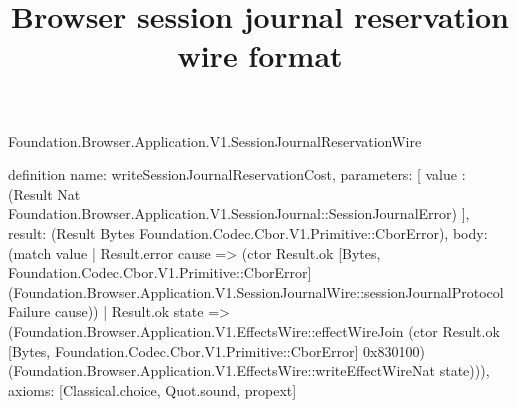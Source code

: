 \begin{lexlean}{Foundation.Browser.Application.V1.SessionJournalReservationWire}
\title{Browser session journal reservation wire format}
\begin{semanticmodule}
definition{
  name: writeSessionJournalReservationCost,
  parameters: [
    value : (Result Nat Foundation.Browser.Application.V1.SessionJournal::SessionJournalError)
  ],
  result: (Result Bytes Foundation.Codec.Cbor.V1.Primitive::CborError),
  body: (match value
    | Result.error cause => (ctor Result.ok [Bytes, Foundation.Codec.Cbor.V1.Primitive::CborError] (Foundation.Browser.Application.V1.SessionJournalWire::sessionJournalProtocolFailure cause))
    | Result.ok state => (Foundation.Browser.Application.V1.EffectsWire::effectWireJoin (ctor Result.ok [Bytes, Foundation.Codec.Cbor.V1.Primitive::CborError] 0x830100) (Foundation.Browser.Application.V1.EffectsWire::writeEffectWireNat state))),
  axioms: [Classical.choice, Quot.sound, propext]
}


\end{semanticmodule}
\end{lexlean}
